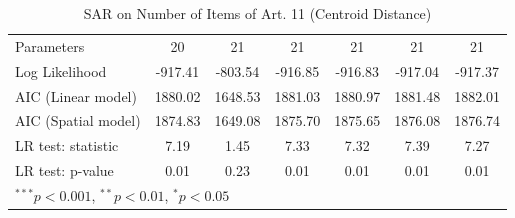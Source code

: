 \begin{table}[!h]
\begin{center}
\begin{tabular}{l c c c c c c }
Parameters              & 20           & 21           & 21           & 21           & 21           & 21           \\
Log Likelihood          & -917.41      & -803.54      & -916.85      & -916.83      & -917.04      & -917.37      \\
AIC (Linear model)      & 1880.02      & 1648.53      & 1881.03      & 1880.97      & 1881.48      & 1882.01      \\
AIC (Spatial model)     & 1874.83      & 1649.08      & 1875.70      & 1875.65      & 1876.08      & 1876.74      \\
LR test: statistic      & 7.19         & 1.45         & 7.33         & 7.32         & 7.39         & 7.27         \\
LR test: p-value        & 0.01         & 0.23         & 0.01         & 0.01         & 0.01         & 0.01         \\
\bottomrule
\multicolumn{7}{l}{\scriptsize{$^{***}p<0.001$, $^{**}p<0.01$, $^*p<0.05$}}
\end{tabular}
\caption{SAR on Number of Items of Art. 11 (Centroid Distance)}
\label{table:coefficients}
\end{center}
\end{table}
